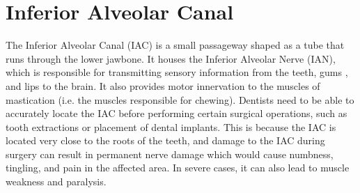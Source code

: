 \section{Inferior Alveolar Canal}
The Inferior Alveolar Canal (IAC) is a small passageway shaped as a tube that
runs through the lower jawbone. It houses the Inferior Alveolar Nerve (IAN),
which is responsible for transmitting sensory information from the teeth, gums
, and lips to the brain. It also provides motor innervation to the muscles of
mastication (i.e. the muscles responsible for chewing). Dentists need to be able
to accurately locate the IAC before performing certain surgical operations, such
as tooth extractions or placement of dental implants. This is because the IAC is
located very close to the roots of the teeth, and damage to the IAC during
surgery can result in permanent nerve damage which would cause numbness,
tingling, and pain in the affected area. In severe cases, it can also lead to
muscle weakness and paralysis.

